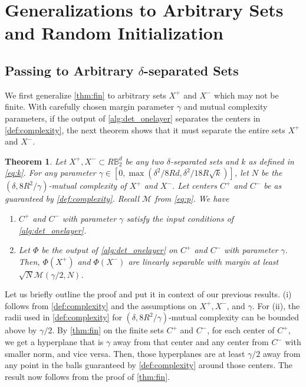 \documentclass[aoap]{imsart}
\numberwithin{equation}{section}
\newtheorem{theorem}{Theorem}[section]
\theoremstyle{definition}
\theoremstyle{remark}
\numberwithin{equation}{section}
\newcommand{\0}{\mathbf{0}}
\newcommand{\1}{\mathbf{1}}
\newcommand{\B}{\mathbb{B}}
\numberwithin{equation}{section}
\begin{document}
\section{Generalizations to Arbitrary Sets and Random Initialization}\label{sec:Two}
\subsection{Passing to Arbitrary $\delta$-separated Sets}
We first generalize \cref{thm:fin} to arbitrary sets $X^+$ and $X^-$ which may not be finite. With carefully chosen margin parameter $\gamma$ and mutual complexity parameters, if the output of \cref{alg:det_onelayer} separates the centers in \cref{def:complexity}, the next theorem shows that it must separate the entire sets $X^+$ and $X^-$.
\begin{theorem}\label{thm:arb}
Let $X^{+}, X^{-}\subset R\B_{2}^{d}$ be any two $\delta$-separated sets and $k$ as defined in \eqref{eq:k}. For any parameter $\gamma\in [0, \max(\delta^2/8Rd, \delta^2/18R\sqrt{k})]$, let $N$ be the $(\delta, 8R^2/\gamma )$-mutual complexity of $X^+$ and $X^-$. Let centers $C^{+}$ and $C^{-}$ be as guaranteed by \cref{def:complexity}. Recall $\mathcal{M}$ from \eqref{eq:p}. We have
\begin{enumerate}
    \item[(i)] $C^+$ and $C^-$ with parameter $\gamma$ satisfy the input conditions of \cref{alg:det_onelayer}.
    \item[(ii)] Let $\Phi$ be the output of \cref{alg:det_onelayer} on $C^+$ and $C^-$ with parameter $\gamma$. Then, $\Phi(X^+)$ and $\Phi(X^-)$ are linearly separable with margin at least $\sqrt{N}\mathcal{M}(\gamma/2, N)$.
\end{enumerate}
\end{theorem}
Let us briefly outline the proof and put it in context of our previous results.
(i) follows from \cref{def:complexity} and the assumptions on $X^+, X^-$, and $\gamma$. For (ii), the radii used in \cref{def:complexity} for $(\delta, 8R^2/\gamma )$-mutual complexity can be bounded above by $\gamma/2$. By \cref{thm:fin} on the finite sets $C^+$ and $C^-$, for each center of $C^{+}$, we get a hyperplane that is $\gamma$ away from that center and any center from $C^{-}$ with smaller norm, and vice versa. Then, those hyperplanes are at least $\gamma/2$ away from any point in the balls guaranteed by \cref{def:complexity} around those centers. The result now follows from the proof of \cref{thm:fin}.
\end{document}
